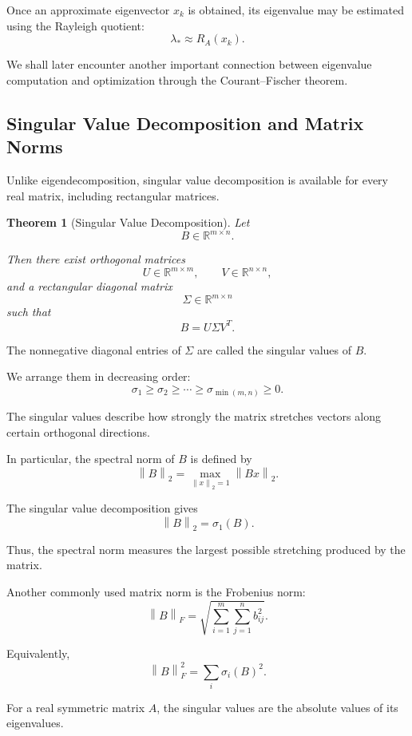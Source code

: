 \documentclass[14pt,letterpaper]{article}
\theoremstyle{plain}
\newtheorem{theorem}{Theorem}[section]
\theoremstyle{definition}
\theoremstyle{remark}
\newcommand{\R}{\mathbb{R}}
\newcommand{\norm}[1]{\left\lVert #1 \right\rVert}
\begin{document}
Once an approximate eigenvector $x_k$ is obtained,
its eigenvalue may be estimated using the
Rayleigh quotient:
\[
\boxed{
\lambda_*\approx R_A(x_k).
}
\]

We shall later encounter another important
connection between eigenvalue computation and
optimization through the Courant--Fischer theorem.


\subsection{Singular Value Decomposition and Matrix Norms}
\label{subsec:svd_background}

Unlike eigendecomposition, singular value
decomposition is available for every real
matrix, including rectangular matrices.

\begin{theorem}[Singular Value Decomposition]
Let
\[
B\in\R^{m\times n}.
\]

Then there exist orthogonal matrices
\[
U\in\R^{m\times m},
\qquad
V\in\R^{n\times n},
\]
and a rectangular diagonal matrix
\[
\Sigma\in\R^{m\times n}
\]
such that
\[
\boxed{
B=U\Sigma V^T.
}
\]
\end{theorem}

The nonnegative diagonal entries of $\Sigma$
are called the singular values of $B$.

We arrange them in decreasing order:
\[
\boxed{
\sigma_1\geq\sigma_2\geq\cdots
\geq\sigma_{\min(m,n)}\geq0.
}
\]

The singular values describe how strongly
the matrix stretches vectors along certain
orthogonal directions.

In particular, the spectral norm of $B$ is
defined by
\[
\boxed{
\norm{B}_2
=
\max_{\norm{x}_2=1}\norm{Bx}_2.
}
\]

The singular value decomposition gives
\[
\boxed{
\norm{B}_2=\sigma_1(B).
}
\]

Thus, the spectral norm measures the largest
possible stretching produced by the matrix.

Another commonly used matrix norm is the
Frobenius norm:
\[
\boxed{
\norm{B}_F
=
\sqrt{
\sum_{i=1}^{m}
\sum_{j=1}^{n}b_{ij}^2
}.
}
\]

Equivalently,
\[
\norm{B}_F^2
=
\sum_i\sigma_i(B)^2.
\]

For a real symmetric matrix $A$, the singular
values are the absolute values of its eigenvalues.
\end{document}
